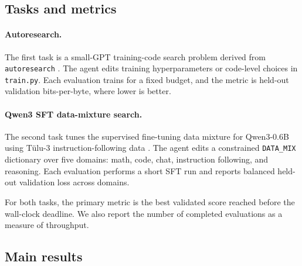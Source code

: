 \documentclass{article}
\begin{document}
\subsection{Tasks and metrics}

\paragraph{Autoresearch.}
The first task is a small-GPT training-code search problem derived from \texttt{autoresearch} \citep{karpathy_autoresearch}. The agent edits training hyperparameters or code-level choices in \texttt{train.py}. Each evaluation trains for a fixed budget, and the metric is held-out validation bits-per-byte, where lower is better.

\paragraph{Qwen3 SFT data-mixture search.}
The second task tunes the supervised fine-tuning data mixture for Qwen3-0.6B \citep{qwen3} using T\"ulu-3 instruction-following data \citep{tulu3}. The agent edits a constrained \texttt{DATA\_MIX} dictionary over five domains: math, code, chat, instruction following, and reasoning. Each evaluation performs a short SFT run and reports balanced held-out validation loss across domains.

For both tasks, the primary metric is the best validated score reached before the wall-clock deadline. We also report the number of completed evaluations as a measure of throughput.

\subsection{Main results}
\end{document}
